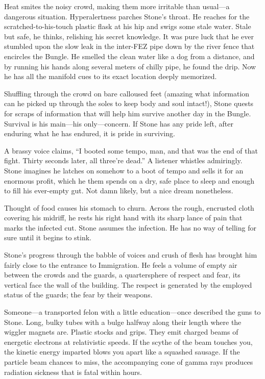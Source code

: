 Heat smites the noisy crowd, making them more irritable than usual---a dangerous situation. Hyperalertness parches Stone's throat. He reaches for the scratched-to-his-touch plastic flask at his hip and swigs some stale water. Stale but safe, he thinks, relishing his secret knowledge. It was pure luck that he ever stumbled upon the slow leak in the inter-FEZ pipe down by the river fence that encircles the Bungle. He smelled the clean water like a dog from a distance, and by running his hands along several meters of chilly pipe, he found the drip. Now he has all the manifold cues to its exact location deeply memorized.

Shuffling through the crowd on bare calloused feet (amazing what information can he picked up through the soles to keep body and soul intact!), Stone quests for scraps of information that will help him survive another day in the Bungle. Survival is his main---his only---concern. If Stone has any pride left, after enduring what he has endured, it is pride in surviving.

A brassy voice claims, ``I booted some tempo, man, and that was the end of that fight. Thirty seconds later, all three're dead.'' A listener whistles admiringly. Stone imagines he latches on somehow to a boot of tempo and sells it for an enormous profit, which he them spends on a dry, safe place to sleep and enough to fill his ever-empty gut. Not damn likely, but a nice dream nonetheless.

Thought of food causes his stomach to churn. Across the rough, encrusted cloth covering his midriff, he rests his right hand with its sharp lance of pain that marks the infected cut. Stone assumes the infection. He has no way of telling for sure until it begins to stink.

Stone's progress through the babble of voices and crush of flesh has brought him fairly close to the entrance to Immigration. He feels a volume of empty air between the crowds and the guards, a quartersphere of respect and fear, its vertical face the wall of the building. The respect is generated by the employed status of the guards; the fear by their weapons.

Someone---a transported felon with a little education---once described the guns to Stone. Long, bulky tubes with a bulge halfway along their length where the wiggler magnets are. Plastic stocks and grips. They emit charged beams of energetic electrons at relativistic speeds. If the scythe of the beam touches you, the kinetic energy imparted blows you apart like a squashed sausage. If the particle beam chances to miss, the accompanying cone of gamma rays produces radiation sickness that is fatal within hours.

